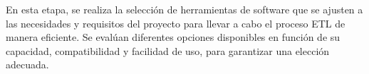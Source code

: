 En esta etapa, se realiza la selección de herramientas de software que se ajusten a las necesidades y requisitos del proyecto para llevar a cabo el proceso ETL de manera eficiente. Se evalúan diferentes opciones disponibles en función de su capacidad, compatibilidad y facilidad de uso, para garantizar una elección adecuada.
